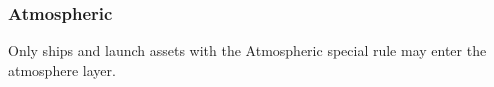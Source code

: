 \subsubsection{Atmospheric}

Only ships and launch assets with the Atmospheric special rule may enter the atmosphere layer.